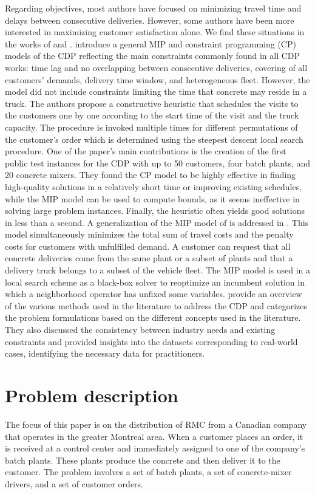 \documentclass{article}
\begin{document}
Regarding objectives, most authors have focused on minimizing travel time and delays between consecutive deliveries. However, some authors have been more interested in maximizing customer satisfaction alone. We find these situations in the works of \cite{durbin2008or} and \cite{kinable2014concrete}. \cite{kinable2014concrete} introduce a general MIP and constraint programming (CP) models of the CDP reflecting the main constraints commonly found in all CDP works: time lag and no overlapping between consecutive deliveries, covering of all customers' demands, delivery time window, and heterogeneous fleet. However, the model did not include constraints limiting the time that concrete may reside in a truck. The authors propose a constructive heuristic that schedules the visits to the customers one by one according to the start time of the visit and the truck capacity. The procedure is invoked multiple times for different permutations of the customer's order which is determined using the steepest descent local search procedure. One of the paper's main contributions is the creation of the first public test instances for the CDP with up to 50 customers, four batch plants, and 20 concrete mixers. They found the CP model to be highly effective in finding high-quality solutions in a relatively short time or improving existing schedules, while the MIP model can be used to compute bounds, as it seems ineffective in solving large problem instances. Finally, the heuristic often yields good solutions in less than a second. A generalization of the MIP model of \cite{kinable2014concrete} is addressed in \cite{asbach2009analysis}. This model simultaneously minimizes the total sum of travel costs and the penalty costs for customers with unfulfilled demand. A customer can request that all concrete deliveries come from the same plant or a subset of plants and that a delivery truck belongs to a subset of the vehicle fleet. The MIP model is used in a local search scheme as a black-box solver to reoptimize an incumbent solution in which a neighborhood operator has unfixed some variables. \cite{tzanetos2023systematic} provide an overview of the various methods used in the literature to address the CDP and categorizes the problem formulations based on the different concepts used in the literature. They also discussed the consistency between industry needs and existing constraints and provided insights into the datasets corresponding to real-world cases, identifying the necessary data for practitioners.

\section{Problem description}
\label{sec:cdp_desc_form}
The focus of this paper is on the distribution of RMC from a Canadian company that operates in the greater Montreal area. When a customer places an order, it is received at a control center and immediately assigned to one of the company's batch plants. These plants produce the concrete and then deliver it to the customer. The problem involves a set of batch plants, a set of concrete-mixer drivers, and a set of customer orders.
\end{document}
